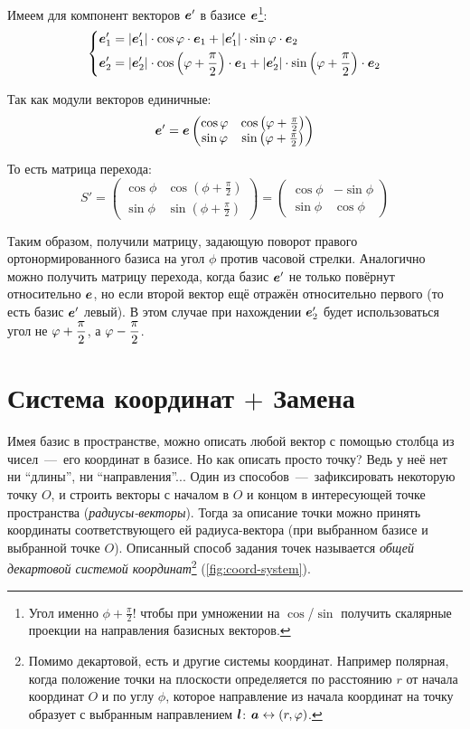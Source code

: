 \documentclass[a4paper,12pt]{article}
\begin{document}
  Имеем для компонент векторов $\boldsymbol e'$ в базисе $\boldsymbol e$\footnote{Угол именно $\phi + \frac{\pi}{2}$! чтобы при умножении на $\cos$/$\sin$ получить скалярные проекции на направления базисных векторов.}:
  \[
    \left\{
      \begin{aligned}
        &\boldsymbol e_1' = |\boldsymbol e_1'| \cdot \cos\varphi \cdot \boldsymbol e_1 + |\boldsymbol e_1'| \cdot \sin\varphi \cdot \boldsymbol e_2\\
        &\boldsymbol e_2' = |\boldsymbol e_2'| \cdot \cos{\left(\varphi+ \frac{\pi}{2}\right)} \cdot \boldsymbol e_1 + |\boldsymbol e_2'| \cdot \sin{\left(\varphi+ \frac{\pi}{2}\right)} \cdot \boldsymbol e_2
      \end{aligned}
    \right.
  \]
  
  Так как модули векторов единичные:
  \[
    \boldsymbol e' = \boldsymbol e \begin{pmatrix}
      \cos\varphi & \cos{\left(\varphi+ \frac{\pi}{2}\right)}\\
      \sin\varphi & \sin{\left(\varphi+ \frac{\pi}{2}\right)}
    \end{pmatrix}
  \]
  
  То есть матрица перехода:
  \[
    S' = \begin{pmatrix}
      \cos\phi & \cos{\left(\phi + \frac{\pi}{2}\right)}\\
      \sin\phi & \sin{\left(\phi + \frac{\pi}{2}\right)}
    \end{pmatrix}
    = \begin{pmatrix}
      \cos\phi & -\sin\phi\\
      \sin\phi & \cos\phi
    \end{pmatrix}
  \]
  
  Таким образом, получили матрицу, задающую поворот правого ортонормированного базиса на угол $\phi$ против часовой стрелки.
  Аналогично можно получить матрицу перехода, когда базис $\boldsymbol e'$ не только повёрнут относительно $\boldsymbol e$, но если второй вектор ещё отражён относительно первого (то есть базис $\boldsymbol e'$ левый).
  В этом случае при нахождении $\boldsymbol e_2'$ будет использоваться угол не $\phi \hm+ \dfrac{\pi}{2}$, а $\phi \hm- \dfrac{\pi}{2}$.
  

  \section{Система координат $+$ Замена}
  
  Имея базис в пространстве, можно описать любой вектор с помощью столбца из чисел~---~его координат в базисе.
  Но как описать просто точку?
  Ведь у неё нет ни ``длины'', ни ``направления''...
  Один из способов~---~зафиксировать некоторую точку $O$, и строить векторы с началом в $O$ и концом в интересующей точке пространства (\emph{радиусы-векторы}).
  Тогда за описание точки можно принять координаты соответствующего ей радиуса-вектора (при выбранном базисе и выбранной точке $O$).
  Описанный способ задания точек называется \emph{общей декартовой системой координат}\footnote{Помимо декартовой, есть и другие системы координат. Например полярная, когда положение точки на плоскости определяется по расстоянию $r$ от начала координат $O$ и по углу $\phi$, которое направление из начала координат на точку образует с выбранным направлением $\boldsymbol l$: $\bds a \hm\leftrightarrow (r, \phi)$.} (\ref{fig:coord-system}).
  
\end{document}
